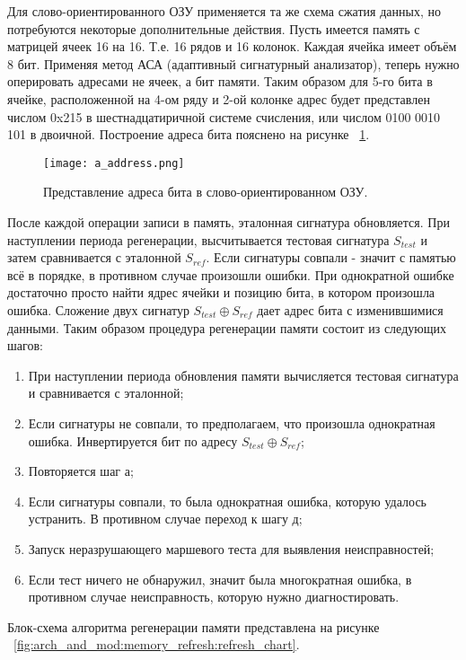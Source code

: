 Для слово-ориентированного ОЗУ применяется та же схема сжатия данных, но потребуются некоторые дополнительные действия. Пусть имеется память с матрицей ячеек 16 на 16. Т.е. 16 рядов и 16 колонок. Каждая ячейка имеет объём 8 бит. Применяя метод АСА (адаптивный сигнатурный анализатор), теперь нужно оперировать адресами не ячеек, а бит памяти. Таким образом для 5-го бита в ячейке, расположенной на 4-ом ряду и 2-ой колонке адрес будет представлен числом  0x215 в шестнадцатиричной системе счисления, или числом 0100 0010 101 в двоичной. Построение адреса бита пояснено на рисунке ~\ref{fig:arch_and_mod:memory_refresh:address}.

\begin{figure}[ht]
\centering
  \texttt{[image: a\_address.png]}  
  \caption{ Представление адреса бита в слово-ориентированном ОЗУ.}
  \label{fig:arch_and_mod:memory_refresh:address}
\end{figure}

После каждой операции записи в память, эталонная сигнатура обновляется. При наступлении периода регенерации, высчитывается тестовая сигнатура $S_{test}$ и затем сравнивается с эталонной $S_{ref}$. Если сигнатуры совпали - значит с памятью всё в порядке, в противном случае произошли ошибки. При однократной ошибке достаточно просто найти ядрес ячейки и позицию бита, в котором произошла ошибка. Сложение двух сигнатур  $S_{test} \oplus S_{ref}$ дает адрес бита с изменившимися данными. Таким образом процедура регенерации памяти состоит из следующих шагов:
\begin{enumerate}
  \item При наступлении периода обновления памяти вычисляется тестовая сигнатура и сравнивается с эталонной;
  \item Если сигнатуры не совпали, то предполагаем, что произошла однократная ошибка. Инвертируется бит по адресу $S_{test} \oplus S_{ref}$;
  \item Повторяется шаг а;
  \item Если сигнатуры совпали, то была однократная ошибка, которую удалось устранить. В противном случае переход к шагу д;
  \item Запуск неразрушающего маршевого теста для выявления неисправностей;
  \item Если тест ничего не обнаружил, значит была многократная ошибка, в противном случае неисправность, которую нужно диагностировать.
\end{enumerate}

Блок-схема алгоритма регенерации памяти представлена на рисунке ~\ref{fig:arch_and_mod:memory_refresh:refresh_chart}.


